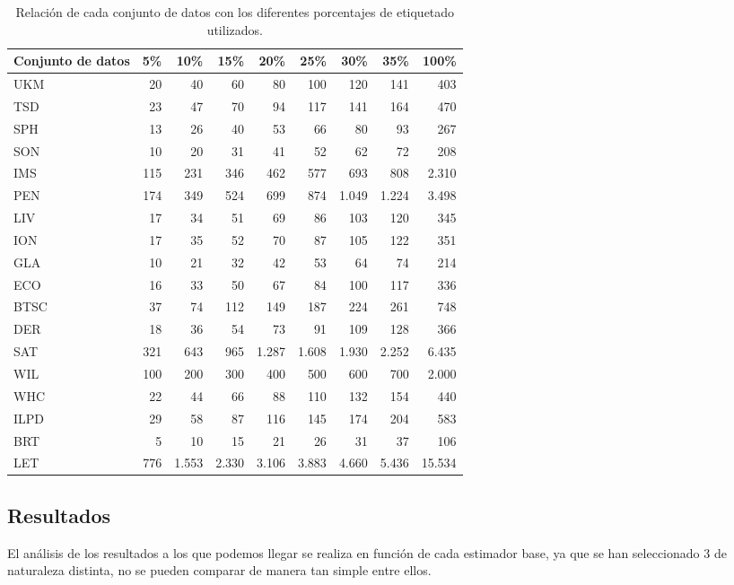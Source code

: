 \begin{table}[]
    \centering
    \tiny
    \begin{tabular}{lrrrrrrr|r}
    \toprule
        \textbf{Conjunto de datos} & \textbf{5\%} & \textbf{10\%} & \textbf{15\%} & \textbf{20\%} & \textbf{25\%} & \textbf{30\%} &\textbf{ 35\%} & \textbf{100\%} \\ 
    \toprule
        UKM & 20 & 40 & 60 & 80 & 100 & 120 & 141 & 403 \\ 
        TSD & 23 & 47 & 70 & 94 & 117 & 141 & 164 & 470 \\ 
        SPH & 13 & 26 & 40 & 53 & 66 & 80 & 93 & 267 \\
        SON & 10 & 20 & 31 & 41 & 52 & 62 & 72 & 208 \\ 
        IMS & 115 & 231 & 346 & 462 & 577 & 693 & 808 & 2.310 \\ 
        PEN & 174 & 349 & 524 & 699 & 874 & 1.049 & 1.224 & 3.498 \\ 
        LIV & 17 & 34 & 51 & 69 & 86 & 103 & 120 & 345 \\ 
        ION & 17 & 35 & 52 & 70 & 87 & 105 & 122 & 351 \\ 
        GLA & 10 & 21 & 32 & 42 & 53 & 64 & 74 & 214 \\
        ECO & 16 & 33 & 50 & 67 & 84 & 100 & 117 & 336 \\
        BTSC & 37 & 74 & 112 & 149 & 187 & 224 & 261 & 748 \\ 
        DER & 18 & 36 & 54 & 73 & 91 & 109 & 128 & 366 \\
        SAT & 321 & 643 & 965 & 1.287 & 1.608 & 1.930 & 2.252 & 6.435 \\ 
        WIL & 100 & 200 & 300 & 400 & 500 & 600 & 700 & 2.000 \\ 
        WHC & 22 & 44 & 66 & 88 & 110 & 132 & 154 & 440 \\ 
        ILPD & 29 & 58 & 87 & 116 & 145 & 174 & 204 & 583 \\ 
        BRT & 5 & 10 & 15 & 21 & 26 & 31 & 37 & 106 \\ 
        LET & 776 & 1.553 & 2.330 & 3.106 & 3.883 & 4.660 & 5.436 & 15.534 \\ 
        \bottomrule
    \end{tabular}
    \caption{Relación de cada conjunto de datos con los diferentes porcentajes de etiquetado utilizados.}\label{tab:exp:percents}
\end{table}

\FloatBarrier
\subsection{Resultados}
El análisis de los resultados a los que podemos llegar se realiza en función de cada estimador base, ya que se han seleccionado 3 de naturaleza distinta, no se pueden comparar de manera tan simple entre ellos.


